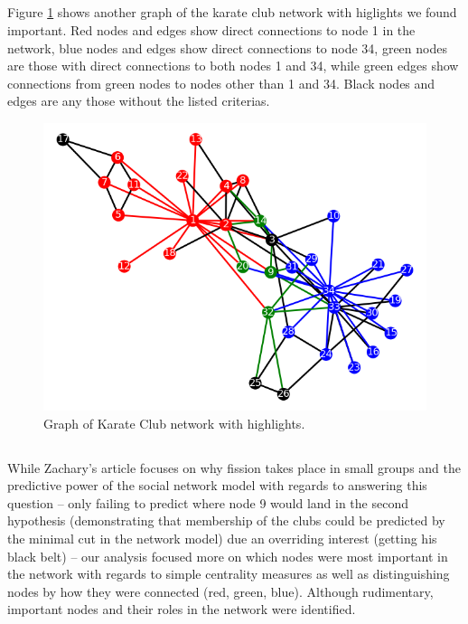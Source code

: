 \documentclass[11pt]{article}
\begin{document}
\subsection{}
Figure \ref{fig:graph model2} shows another graph of the karate club network with
higlights we found important. Red nodes and edges show direct connections to node 1
in the network, blue nodes and edges show direct connections to node 34, green nodes
are those with direct connections to both nodes 1 and 34, while green edges show
connections from green nodes to nodes other than 1 and 34. Black nodes and edges are
any those without the listed criterias.

\begin{figure}
  \includegraphics[width=\linewidth]{Figure_2.png}
  \caption{Graph of Karate Club network with highlights.}
  \label{fig:graph model2}
\end{figure}

\subsection{}
While Zachary's article focuses on why fission takes place in small groups and the
predictive power of the social network model with regards to answering this question
-- only failing to predict where node 9 would land in the second hypothesis
(demonstrating that membership of the clubs could be predicted by the minimal cut
in the network model) due an overriding interest (getting his black belt) -- our
analysis focused more on which nodes were most important in the network with regards
to simple centrality measures as well as distinguishing nodes by how they were connected
(red, green, blue). Although rudimentary, important nodes and their roles in the network
were identified.
\end{document}
